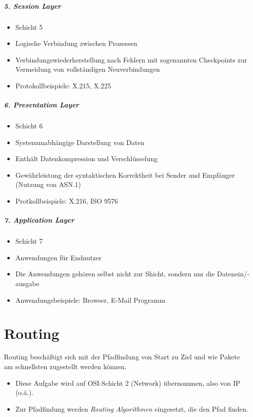 \documentclass[a4paper, 11pt, accentcolor = tud3b]{tudreport}
\begin{document}
        \paragraph{5. Session Layer}
	        \begin{itemize}
	        	\item Schicht 5
	        	\item Logische Verbindung zwischen Prozessen
	        	\item Verbindungswiederherstellung nach Fehlern mit sogenannten Checkpoints zur Vermeidung von vollständigen Neuverbindungen
	        	\item Protokollbeispiele: X.215, X.225
	        \end{itemize}
        
        \paragraph{6. Presentation Layer}
	        \begin{itemize}
	        	\item Schicht 6
	        	\item Systemunabhängige Darstellung von Daten
	        	\item Enthält Datenkompression und Verschlüsselung
	        	\item Gewährleistung der syntaktischen Korrektheit bei Sender und Empfänger (Nutzung von ASN.1)
	        	\item Protkollbeispiele: X.216, ISO 9576
	        \end{itemize}
        
        \paragraph{7. Application Layer}
	        \begin{itemize}
	        	\item Schicht 7
	        	\item Anwendungen für Endnutzer
	        	\item Die Anwendungen gehören selbst nicht zur Shicht, sondern nur die Datenein/-ausgabe
	        	\item Anwendungsbeispiele: Browser, E-Mail Programm
	        \end{itemize}

    \chapter{Routing}
        Routing beschäftigt sich mit der Pfadfindung von Start zu Ziel und wie Pakete am schnellsten zugestellt werden können.
        \begin{itemize}
        	\item Diese Aufgabe wird auf OSI-Schicht 2 (Network) übernommen, also von IP (o.ä.).
        	\item Zur Pfadfindung werden \textit{Routing Algorithmen} eingesetzt, die den Pfad finden.
        \end{itemize}
\end{document}
